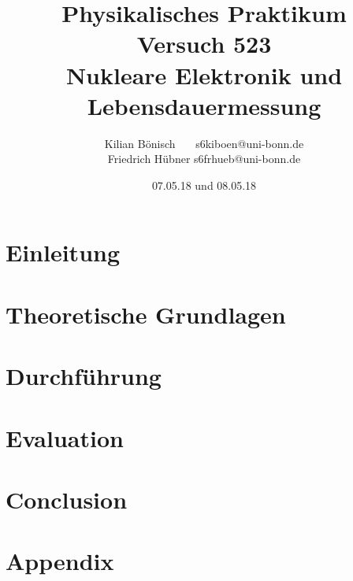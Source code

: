 \documentclass{article}
\newcommand{\RM}[1]{\MakeUppercase{\romannumeral #1}}
\begin{document}
\setlength{\parindent}{0em}   %
\title{Physikalisches Praktikum \RM{5}\\Versuch 523\\Nukleare Elektronik und Lebensdauermessung}
\author{Kilian Bönisch \ \ \ \qquad s6kiboen@uni-bonn.de \\
  Friedrich Hübner \qquad s6frhueb@uni-bonn.de }
\date{07.05.18 und 08.05.18}

\maketitle
\thispagestyle{empty}

\newpage

\thispagestyle{empty}

\tableofcontents

\newpage

\section{Einleitung}



\section{Theoretische Grundlagen}



\section{Durchführung}



\section{Evaluation}



\section{Conclusion}



\FloatBarrier

\newpage

\printbibliography

\newpage

\section{Appendix}

\end{document}
